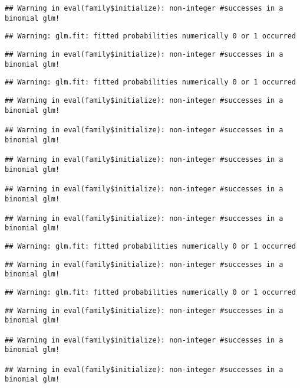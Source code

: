 \documentclass[
]{article}
\begin{document}
\begin{verbatim}
## Warning in eval(family$initialize): non-integer #successes in a binomial glm!
\end{verbatim}

\begin{verbatim}
## Warning: glm.fit: fitted probabilities numerically 0 or 1 occurred
\end{verbatim}

\begin{verbatim}
## Warning in eval(family$initialize): non-integer #successes in a binomial glm!
\end{verbatim}

\begin{verbatim}
## Warning: glm.fit: fitted probabilities numerically 0 or 1 occurred
\end{verbatim}

\begin{verbatim}
## Warning in eval(family$initialize): non-integer #successes in a binomial glm!

## Warning in eval(family$initialize): non-integer #successes in a binomial glm!

## Warning in eval(family$initialize): non-integer #successes in a binomial glm!

## Warning in eval(family$initialize): non-integer #successes in a binomial glm!

## Warning in eval(family$initialize): non-integer #successes in a binomial glm!
\end{verbatim}

\begin{verbatim}
## Warning: glm.fit: fitted probabilities numerically 0 or 1 occurred
\end{verbatim}

\begin{verbatim}
## Warning in eval(family$initialize): non-integer #successes in a binomial glm!
\end{verbatim}

\begin{verbatim}
## Warning: glm.fit: fitted probabilities numerically 0 or 1 occurred
\end{verbatim}

\begin{verbatim}
## Warning in eval(family$initialize): non-integer #successes in a binomial glm!

## Warning in eval(family$initialize): non-integer #successes in a binomial glm!

## Warning in eval(family$initialize): non-integer #successes in a binomial glm!
\end{verbatim}
\end{document}

